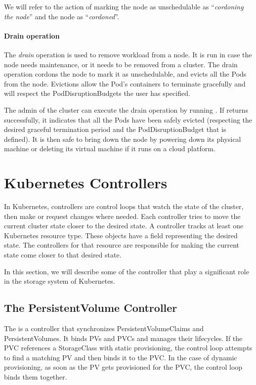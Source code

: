 We will refer to the action of marking the node as unschedulable as
``\textit{cordoning the node}'' and the node as ``\textit{cordoned}''.

\paragraph*{Drain operation}

The \textit{drain} operation is used to remove workload from a node. It is run
in case the node needs maintenance, or it needs to be removed from a cluster.
The drain operation cordons the node to mark it as unschedulable, and evicts all
the Pods from the node.  Evictions allow the Pod's containers to terminate
gracefully and will respect the PodDisruptionBudgets the user has specified.

The admin of the cluster can execute the drain operation by running . If  returns successfully, it indicates that all
	the Pods have been safely evicted (respecting the desired graceful
	termination period and the PodDisruptionBudget that is defined). It is then
	safe to bring down the node by powering down its physical machine or
	deleting its virtual machine if it runs on a cloud platform.

\section{Kubernetes Controllers}
In Kubernetes, controllers are control loops that watch the state of the
cluster, then make or request changes where needed. Each controller tries to
move the current cluster state closer to the desired state. A controller tracks
at least one Kubernetes resource type. These objects have a  field
representing the desired state. The controllers for that resource are
responsible for making the current state come closer to that desired state.

In this section, we will describe some of the controller that play a significant
role in the storage system of Kubernetes.


\subsection{The PersistentVolume Controller}

The  is a controller that synchronizes
PersistentVolumeClaims and PersistentVolumes.  It binds PVs and PVCs and manages
their lifecycles. If the PVC references a StorageClass with static provisioning,
the control loop attempts to find a matching PV and then binds it to the PVC. In
the case of dynamic provisioning, as soon as the PV gets provisioned for the
PVC, the control loop binds them together.

